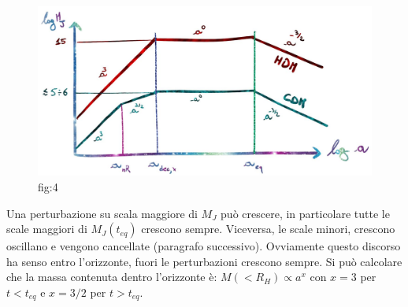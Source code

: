 \begin{figure}[H]
    \centering
    \includegraphics[width=.8 \textwidth]{Pictures/7/mjhotncold.jpg}
    \caption{fig:4}
\end{figure}
Una perturbazione su scala maggiore di $M_J$ può crescere, in particolare tutte le scale maggiori di $M_J(t_{eq})$ crescono sempre. Viceversa, le scale minori, crescono oscillano e  vengono cancellate (paragrafo successivo). Ovviamente questo discorso ha senso entro l'orizzonte, fuori le perturbazioni crescono sempre. Si può calcolare che la massa contenuta dentro l'orizzonte è: $M(<R_H) \propto a^x$ con $x =3$ per $t<t_{eq}$ e $x =3/2$ per $t>t_{eq}$.


